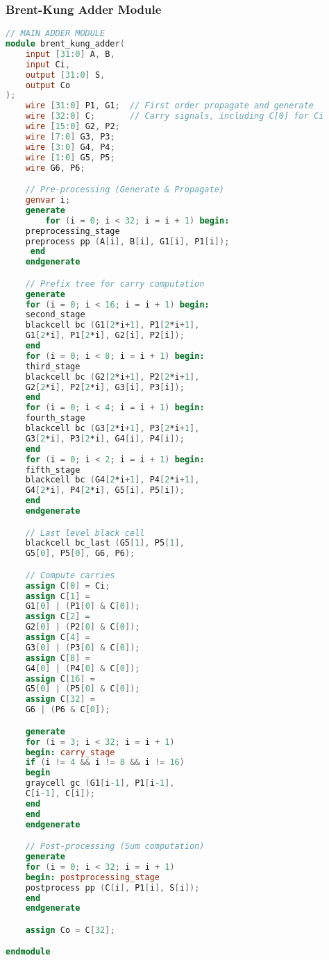 \documentclass{IEEEtran}
\begin{document}
\subsubsection{Brent-Kung Adder Module}
\begin{lstlisting}[language=Verilog]
// MAIN ADDER MODULE
module brent_kung_adder(
    input [31:0] A, B,
    input Ci,
    output [31:0] S,
    output Co
);
    wire [31:0] P1, G1;  // First order propagate and generate
    wire [32:0] C;       // Carry signals, including C[0] for Ci
    wire [15:0] G2, P2;
    wire [7:0] G3, P3;
    wire [3:0] G4, P4;
    wire [1:0] G5, P5;
    wire G6, P6;

    // Pre-processing (Generate & Propagate)
    genvar i;
    generate
        for (i = 0; i < 32; i = i + 1) begin: 
    preprocessing_stage    
    preprocess pp (A[i], B[i], G1[i], P1[i]);
     end
    endgenerate

    // Prefix tree for carry computation
    generate
    for (i = 0; i < 16; i = i + 1) begin: 
    second_stage
    blackcell bc (G1[2*i+1], P1[2*i+1],
    G1[2*i], P1[2*i], G2[i], P2[i]);
    end
    for (i = 0; i < 8; i = i + 1) begin:
    third_stage
    blackcell bc (G2[2*i+1], P2[2*i+1],
    G2[2*i], P2[2*i], G3[i], P3[i]);
    end
    for (i = 0; i < 4; i = i + 1) begin:
    fourth_stage
    blackcell bc (G3[2*i+1], P3[2*i+1], 
    G3[2*i], P3[2*i], G4[i], P4[i]);
    end
    for (i = 0; i < 2; i = i + 1) begin:
    fifth_stage
    blackcell bc (G4[2*i+1], P4[2*i+1],
    G4[2*i], P4[2*i], G5[i], P5[i]);
    end
    endgenerate

    // Last level black cell
    blackcell bc_last (G5[1], P5[1],
    G5[0], P5[0], G6, P6);

    // Compute carries
    assign C[0] = Ci;  
    assign C[1] = 
    G1[0] | (P1[0] & C[0]);
    assign C[2] = 
    G2[0] | (P2[0] & C[0]);
    assign C[4] = 
    G3[0] | (P3[0] & C[0]);
    assign C[8] =
    G4[0] | (P4[0] & C[0]);
    assign C[16] = 
    G5[0] | (P5[0] & C[0]);
    assign C[32] = 
    G6 | (P6 & C[0]);

    generate
    for (i = 3; i < 32; i = i + 1) 
    begin: carry_stage
    if (i != 4 && i != 8 && i != 16)
    begin
    graycell gc (G1[i-1], P1[i-1],
    C[i-1], C[i]);
    end
    end
    endgenerate

    // Post-processing (Sum computation)
    generate
    for (i = 0; i < 32; i = i + 1) 
    begin: postprocessing_stage
    postprocess pp (C[i], P1[i], S[i]);
    end
    endgenerate

    assign Co = C[32];

endmodule
\end{lstlisting}
\end{document}
